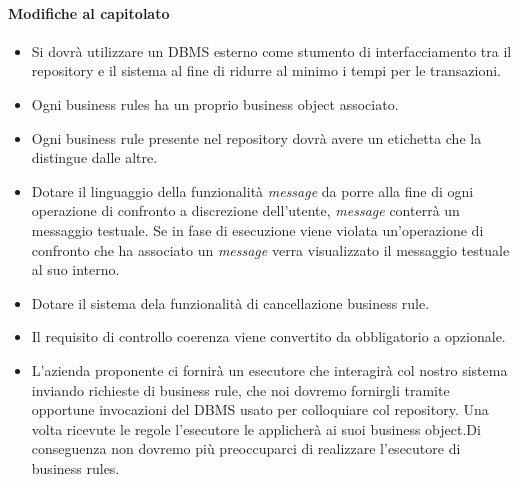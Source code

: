 \documentclass[11pt,titlepage,a4paper]{report}
\begin{document}
\paragraph{Modifiche al capitolato}

\begin{itemize}

\item Si dovr\`a utilizzare un DBMS esterno come stumento di interfacciamento tra il repository e il sistema al fine di ridurre al minimo i tempi per le transazioni.

\item Ogni business rules ha un proprio business object associato.

\item Ogni business rule presente nel repository dovr\`a avere un etichetta che la distingue dalle altre.

\item Dotare il linguaggio della funzionalit\`a \textit{message} da porre alla fine di ogni operazione di confronto a discrezione dell'utente, \textit{message} conterr\`a un messaggio testuale. Se in fase di esecuzione viene violata un'operazione di confronto che ha associato un \textit{message} verra visualizzato il messaggio testuale al suo interno.

\item Dotare il sistema dela funzionalit\`a di cancellazione business rule.

\item Il requisito di controllo coerenza viene convertito da obbligatorio a opzionale.

\item L'azienda proponente ci fornir\`a un esecutore che interagir\`a col nostro sistema inviando richieste di business rule, che noi dovremo fornirgli tramite opportune invocazioni del DBMS usato per colloquiare col repository. Una volta ricevute le regole l'esecutore le applicher\`a ai suoi business object.Di conseguenza non dovremo pi\`u preoccuparci di realizzare l'esecutore di business rules.
\end{itemize}
\end{document}
